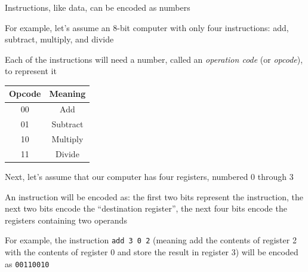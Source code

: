 \documentclass[8pt,a4paper,compress]{beamer}
\begin{document}
\begin{frame}[fragile]
Instructions, like data, can be encoded as numbers

\bigskip

For example, let's assume an 8-bit computer with only four instructions: add, subtract, multiply, and divide

\bigskip

Each of the instructions will need a number, called an \emph{operation code} (or \emph{opcode}), to represent it
\begin{center}
\begin{tabular}{cc}
Opcode & Meaning \\ \hline
00 & Add \\
01 & Subtract \\ 
10 & Multiply \\
11 & Divide
\end{tabular}
\end{center}

\bigskip

Next, let's assume that our computer has four registers, numbered 0 through 3

\bigskip

An instruction will be encoded as: the first two bits represent the instruction, the next two bits encode the ``destination register'', the next four bits encode the registers containing two operands

\bigskip

For example, the instruction \lstinline{add 3 0 2} (meaning add the contents of register 2 with the contents of register 0 and store the result in register 3) will be encoded as \lstinline{00110010}
\end{frame}
\end{document}
